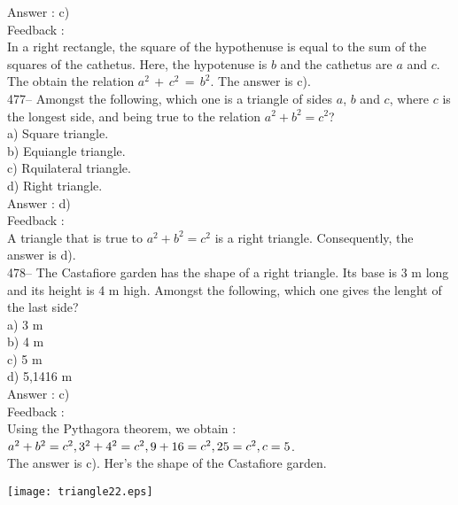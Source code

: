 \documentclass[letterpaper, 12pt]{article}
\begin{document}
Answer :  c)\\

Feedback : \\
In a right rectangle, the square of the hypothenuse is equal to the sum of the squares of the cathetus. Here, the hypotenuse is $b$ and the cathetus are $a$ and $c$. The obtain the relation $a^{2}\,+\,c^{2}\,=\,b^{2}$.  The answer is c).\\


477-- Amongst the following, which one is a triangle of sides $a$, $b$ and $c$, where $c$ is the longest side, and being true to the relation $a^{2}+b^{2}=c^{2}$?\\
a) Square triangle.\\
b) Equiangle triangle.\\
c) Rquilateral triangle.\\
d) Right triangle.\\

Answer :  d)\\

Feedback : \\
A triangle that is true to $a^{2}+b^{2}=c^{2}$ is a right triangle. Consequently, the answer is d).\\


478-- The Castafiore garden has the shape of a right triangle. Its base is 3 m long and its height is 4 m high. Amongst the following, which one gives the lenght of the last side?\\
a) 3 m\\
b) 4 m\\
c) 5 m\\
d) 5,1416 m\\

Answer :  c)\\

Feedback : \\
Using the Pythagora theorem, we obtain :\\
$a^{2}+b^{2}=c^{2},\\
3^{2}+4^{2}=c^{2},\\
9+16=c^{2},\\
25=c^{2},\\
c=5$.\\
The answer is c).  Her's the shape of the Castafiore garden.\\
    \begin{center}
    \texttt{[image: triangle22.eps]}
    \end{center}
\end{document}
